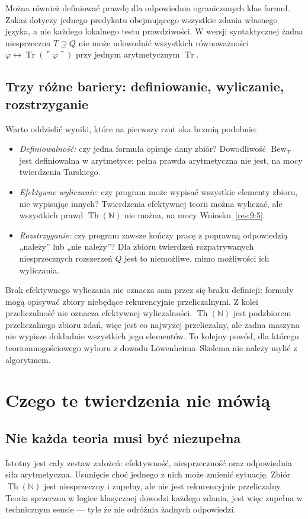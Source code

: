 \documentclass[11pt,a4paper]{article}
\numberwithin{equation}{section}
\theoremstyle{plain}
\theoremstyle{definition}
\theoremstyle{remark}
\begin{document}
Można również definiować prawdę dla odpowiednio ograniczonych klas formuł. Zakaz dotyczy jednego predykatu obejmującego wszystkie zdania własnego języka, a nie każdego lokalnego testu prawdziwości. W wersji syntaktycznej żadna niesprzeczna $T\supseteq Q$ nie może udowodnić wszystkich równoważności $\varphi\leftrightarrow\operatorname{Tr}(\ulcorner\varphi\urcorner)$ przy jednym arytmetycznym $\operatorname{Tr}$.

\subsection*{Trzy różne bariery: definiowanie, wyliczanie, rozstrzyganie}\label{sec:18:4}
Warto oddzielić wyniki, które na pierwszy rzut oka brzmią podobnie:
\begin{itemize}
\item \emph{Definiowalność:} czy jedna formuła opisuje dany zbiór? Dowodliwość $\operatorname{Bew}_T$ jest definiowalna w arytmetyce; pełna prawda arytmetyczna nie jest, na mocy twierdzenia Tarskiego.
\item \emph{Efektywne wyliczanie:} czy program może wypisać wszystkie elementy zbioru, nie wypisując innych? Twierdzenia efektywnej teorii można wyliczać, ale wszystkich prawd $\operatorname{Th}(\mathbb N)$ nie można, na mocy Wniosku~\ref{res:9:5}.
\item \emph{Rozstrzyganie:} czy program zawsze kończy pracę z poprawną odpowiedzią „należy” lub „nie należy”? Dla zbioru twierdzeń rozpatrywanych niesprzecznych rozszerzeń $Q$ jest to niemożliwe, mimo możliwości ich wyliczania.
\end{itemize}
Brak efektywnego wyliczania nie oznacza sam przez się braku definicji: formuły mogą opisywać zbiory niebędące rekurencyjnie przeliczalnymi. Z kolei przeliczalność nie oznacza efektywnej wyliczalności. $\operatorname{Th}(\mathbb N)$ jest podzbiorem przeliczalnego zbioru zdań, więc jest co najwyżej przeliczalny, ale żadna maszyna nie wypisze dokładnie wszystkich jego elementów. To kolejny powód, dla którego teoriomnogościowego wyboru z dowodu Löwenheima--Skolema nie należy mylić z algorytmem.

\section{Czego te twierdzenia nie mówią}\label{sec:czego-nie-mowia}
\subsection*{Nie każda teoria musi być niezupełna}\label{sec:19:1}
Istotny jest cały zestaw założeń: efektywność, niesprzeczność oraz odpowiednia siła arytmetyczna. Usunięcie choć jednego z nich może zmienić sytuację. Zbiór $\operatorname{Th}(\mathbb N)$ jest niesprzeczny i zupełny, ale nie jest rekurencyjnie przeliczalny. Teoria sprzeczna w logice klasycznej dowodzi każdego zdania, jest więc zupełna w technicznym sensie --- tyle że nie odróżnia żadnych odpowiedzi.
\end{document}
